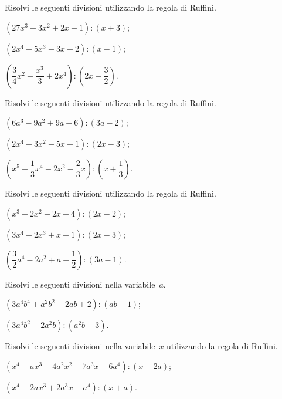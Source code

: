 \begin{esercizio}
\label{ese:11.35}
Risolvi le seguenti divisioni utilizzando la regola di Ruffini.
\begin{multicols}{2}
 \begin{enumeratea}
 \item $\left(27x^{3}-3x^{2}+2x+1\right):(x+3)$;
 \item $\left(2x^{4}-5x^{3}-3x+2\right):(x-1)$;
 \item $\left(\dfrac{3}{4}x^{2}-\dfrac{x^{3}}{3}+2x^{4}\right):\left(2x-\dfrac{3}{2}\right)$.
 \end{enumeratea}
\end{multicols}
\end{esercizio}
\pagebreak
\begin{esercizio}
\label{ese:11.36}
Risolvi le seguenti divisioni utilizzando la regola di Ruffini.
 \begin{enumeratea}
 \item $\left(6a^{3}-9a^{2}+9a-6\right):(3a-2)$;
 \item $(2x^{4}-3x^{2}-5x+1):(2x-3)$;
 \item $\left(x^{5}+\dfrac{1}{3}x^{4}-2x^{2}-\dfrac{2}{3}x\right):\left(x+\dfrac{1}{3}\right)$.
 \end{enumeratea}
\end{esercizio}

\begin{esercizio}[\Ast]
\label{ese:11.37}
Risolvi le seguenti divisioni utilizzando la regola di Ruffini.
 \begin{enumeratea}
 \item $\left(x^{3}-2x^{2}+2x-4\right):(2x-2)$;
 \item $\left(3x^{4}-2x^{3}+x-1\right):(2x-3)$;
 \item $\left(\dfrac{3}{2}a^{4}-2a^{2}+a-\dfrac{1}{2}\right):(3a-1)$.
 \end{enumeratea}
\end{esercizio}

\begin{esercizio}[\Ast]
\label{ese:11.38}
Risolvi le seguenti divisioni nella variabile~$a$.
 \begin{enumeratea}
 \item $\left(3a^{4}b^{4}+a^{2}b^{2}+2ab+2\right):(ab-1)$;
 \item $\left(3a^{4}b^{2}-2a^{2}b\right):(a^{2}b-3)$.
 \end{enumeratea}
\end{esercizio}

\begin{esercizio}[\Ast]
\label{ese:11.39}
Risolvi le seguenti divisioni nella variabile~$x$ utilizzando la regola di Ruffini.
 \begin{enumeratea}
 \item $\left(x^{4}-ax^{3}-4a^{2}x^{2}+7a^{3}x-6a^{4}\right):(x-2a)$;
 \item $\left(x^{4}-2ax^{3}+2a^{3}x-a^{4}\right):(x+a)$.
 \end{enumeratea}
\end{esercizio}

